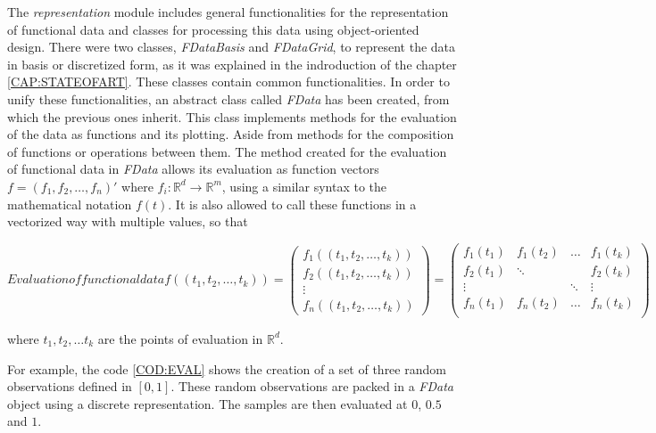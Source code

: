 The \textit{representation} module includes general functionalities for the
representation of functional data and classes for processing this data using
object-oriented design.
There were two classes, \textit{FDataBasis}
and \textit{FDataGrid}, to represent the data in basis or discretized form, as it was explained in the indroduction of the chapter \ref{CAP:STATEOFART}.
These classes contain common functionalities.
In order to unify these functionalities, an abstract class called \textit{FData}
has been created, from which the previous ones inherit. This class implements methods for the
evaluation of the data as functions and its plotting.
Aside from methods for the composition of functions or operations between them.
The method created for the evaluation of functional data in \textit{FData}
allows its evaluation
as function vectors $f = (f_1, f_2, \dots, f_n)'$ where
$f_i:\mathbb{R}^d\rightarrow\mathbb{R}^m$, using a similar syntax to the mathematical
notation $f(t)$. It is also allowed to call these functions in a vectorized way with multiple values, so that

\begin{equation}[]{Evaluation of functional data}
f((t_1, t_2, \dots, t_k)) =
\begin{pmatrix}
    f_1((t_1, t_2, \dots, t_k))\\
    f_2((t_1, t_2, \dots, t_k))\\
    \vdots\\
    f_n((t_1, t_2, \dots, t_k))
  \end{pmatrix}
=
\begin{pmatrix}
f_1(t_1) & f_1(t_2) & \dots & f_1(t_k) \\
f_2(t_1) & \ddots &  & f_2(t_k) \\
\vdots &  & \ddots & \vdots \\
f_n(t_1) & f_n(t_2) & \dots & f_n(t_k) \\
\end{pmatrix}
\end{equation}

where $t_1, t_2, \dots t_k$ are the points of evaluation in $\mathbb{R}^d$.

For example, the code \ref{COD:EVAL} shows the creation of a set of three random observations
defined in $[0, 1]$. These random observations are packed in a \textit{FData} object
using a discrete representation. The samples are then evaluated at $0$, $0.5$ and $1$.

